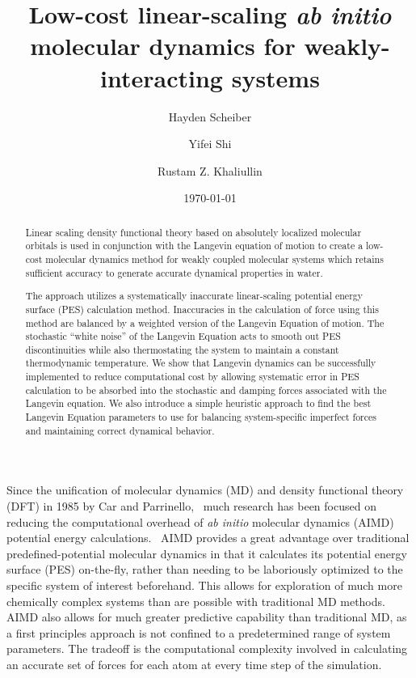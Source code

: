\documentclass[10pt,aps,prl,twocolumn,amsmath,amssymb,superscriptaddress,longbibliography]{revtex4-1}
\begin{document}
\title{
Low-cost linear-scaling \emph{ab initio} molecular dynamics for weakly-interacting systems
}

\author{Hayden Scheiber}
\author{Yifei Shi}
\author{Rustam Z. Khaliullin}

\date{\today}

\begin{abstract}
Linear scaling density functional theory based on absolutely localized molecular orbitals is used in conjunction with the Langevin equation of motion to create a low-cost molecular dynamics method for weakly coupled molecular systems which retains sufficient accuracy to generate accurate dynamical properties in water. 

The approach utilizes a systematically inaccurate linear-scaling potential energy surface (PES) calculation method. 
Inaccuracies in the calculation of force using this method are balanced by a weighted version of the Langevin Equation of motion. 
The stochastic ``white noise'' of the Langevin Equation acts to smooth out PES discontinuities while also thermostating the system to maintain a constant thermodynamic temperature. 
We show that Langevin dynamics can be successfully implemented to reduce computational cost by allowing systematic error in PES calculation to be absorbed into the stochastic and damping forces associated with the Langevin equation. 
We also introduce a simple heuristic approach to find the best Langevin Equation parameters to use for balancing system-specific imperfect forces and maintaining correct dynamical behavior.
\end{abstract}

\maketitle
Since the unification of molecular dynamics (MD) and density functional theory (DFT) in 1985 by Car and Parrinello,~\cite{a:thecpmd} much research has been focused on reducing the computational overhead of \emph{ab initio} molecular dynamics (AIMD) potential energy calculations.~\cite{b:aimd} 
AIMD provides a great advantage over traditional predefined-potential molecular dynamics in that it calculates its potential energy surface (PES) on-the-fly, rather than needing to be laboriously optimized to the specific system of interest beforehand. 
This allows for exploration of much more chemically complex systems than are possible with traditional MD methods. 
AIMD also allows for much greater predictive capability than traditional MD, as a first principles approach is not confined to a predetermined range of system parameters. 
The tradeoff is the computational complexity involved in calculating an accurate set of forces for each atom at every time step of the simulation.~\cite{a:2gen-cpmd}
\end{document}
